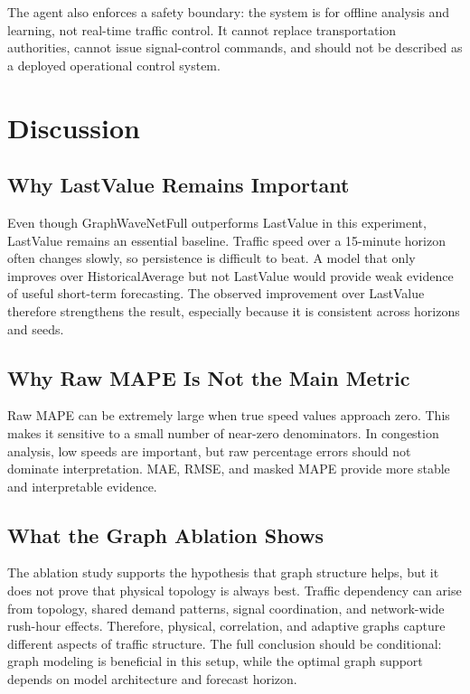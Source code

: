 \documentclass[11pt]{article}
\begin{document}
The agent also enforces a safety boundary: the system is for offline analysis and learning, not real-time traffic control. It cannot replace transportation authorities, cannot issue signal-control commands, and should not be described as a deployed operational control system.

\section{Discussion}
\subsection{Why LastValue Remains Important}
Even though GraphWaveNetFull outperforms LastValue in this experiment, LastValue remains an essential baseline. Traffic speed over a 15-minute horizon often changes slowly, so persistence is difficult to beat. A model that only improves over HistoricalAverage but not LastValue would provide weak evidence of useful short-term forecasting. The observed improvement over LastValue therefore strengthens the result, especially because it is consistent across horizons and seeds.

\subsection{Why Raw MAPE Is Not the Main Metric}
Raw MAPE can be extremely large when true speed values approach zero. This makes it sensitive to a small number of near-zero denominators. In congestion analysis, low speeds are important, but raw percentage errors should not dominate interpretation. MAE, RMSE, and masked MAPE provide more stable and interpretable evidence.

\subsection{What the Graph Ablation Shows}
The ablation study supports the hypothesis that graph structure helps, but it does not prove that physical topology is always best. Traffic dependency can arise from topology, shared demand patterns, signal coordination, and network-wide rush-hour effects. Therefore, physical, correlation, and adaptive graphs capture different aspects of traffic structure. The full conclusion should be conditional: graph modeling is beneficial in this setup, while the optimal graph support depends on model architecture and forecast horizon.
\end{document}
